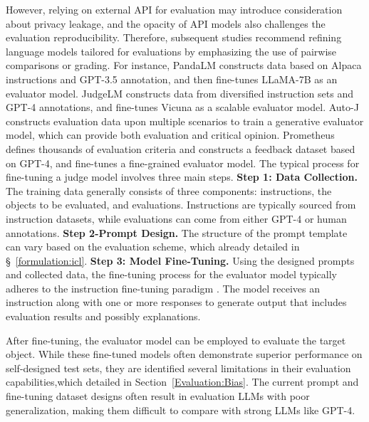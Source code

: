 \documentclass[acmsmall,screen]{acmart}
\begin{document}
However, relying on external API for evaluation may introduce consideration about privacy leakage, and the opacity of API models also challenges the evaluation reproducibility. Therefore, subsequent studies recommend refining language models tailored for evaluations by emphasizing the use of pairwise comparisons or grading.
For instance, PandaLM \cite{wang2023pandalm} constructs data based on Alpaca instructions and GPT-3.5 annotation, and then fine-tunes LLaMA-7B \cite{touvron2023llama} as an evaluator model. JudgeLM \cite{zhu2023judgelm} constructs data from diversified instruction sets and GPT-4 annotations, and fine-tunes Vicuna \cite{vicuna2023} as a scalable evaluator model. Auto-J \cite{auto-j} constructs evaluation data upon multiple scenarios to train a generative evaluator model, which can provide both evaluation and critical opinion. Prometheus \cite{prometheus} defines thousands of evaluation criteria and constructs a feedback dataset based on GPT-4, and fine-tunes a fine-grained evaluator model. 
The typical process for fine-tuning a judge model involves three main steps.
\noindent\textbf{Step 1: Data Collection.} The training data generally consists of three components: instructions, the objects to be evaluated, and evaluations. Instructions are typically sourced from instruction datasets, while evaluations can come from either GPT-4 or human annotations.
\noindent\textbf{Step 2-Prompt Design.} The structure of the prompt template can vary based on the evaluation scheme, which already detailed in \S~\ref{formulation:icl}.
\noindent\textbf{Step 3: Model Fine-Tuning.} Using the designed prompts and collected data, the fine-tuning process for the evaluator model typically adheres to the instruction fine-tuning paradigm \cite{ouyang2022training}. The model receives an instruction along with one or more responses to generate output that includes evaluation results and possibly explanations.



After fine-tuning, the evaluator model can be employed to evaluate the target object. While these fine-tuned models often demonstrate superior performance on self-designed test sets, they are identified several limitations in their evaluation capabilities,which detailed in Section~\ref{Evaluation:Bias}.  The current prompt and fine-tuning dataset designs often result in evaluation LLMs with poor generalization, making them difficult to compare with strong LLMs like GPT-4.
\end{document}
